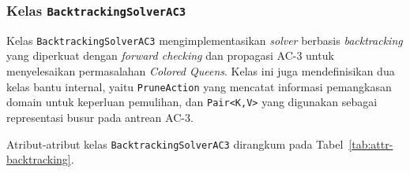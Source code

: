 \subsubsection{Kelas \texttt{BacktrackingSolverAC3}}
\label{subsubsec:kelas-backtracking}

Kelas \texttt{BacktrackingSolverAC3} mengimplementasikan \textit{solver} berbasis \textit{backtracking} yang diperkuat dengan \textit{forward checking} dan propagasi AC-3 untuk menyelesaikan permasalahan \textit{Colored Queens}. Kelas ini juga mendefinisikan dua kelas bantu internal, yaitu \texttt{PruneAction} yang mencatat informasi pemangkasan domain untuk keperluan pemulihan, dan \texttt{Pair<K,V>} yang digunakan sebagai representasi busur pada antrean AC-3.

Atribut-atribut kelas \texttt{BacktrackingSolverAC3} dirangkum pada Tabel~\ref{tab:attr-backtracking}.

